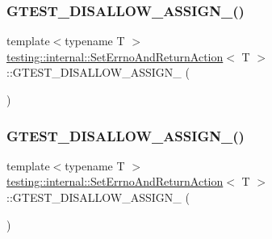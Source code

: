 \subsubsection{\texorpdfstring{GTEST\_DISALLOW\_ASSIGN\_()}{GTEST\_DISALLOW\_ASSIGN\_()}\hspace{0.1cm}{\footnotesize\ttfamily [1/3]}}
{\footnotesize\ttfamily template$<$typename T $>$ \\
\mbox{\hyperlink{classtesting_1_1internal_1_1_set_errno_and_return_action}{testing\+::internal\+::\+Set\+Errno\+And\+Return\+Action}}$<$ T $>$\+::G\+T\+E\+S\+T\+\_\+\+D\+I\+S\+A\+L\+L\+O\+W\+\_\+\+A\+S\+S\+I\+G\+N\+\_\+ (\begin{DoxyParamCaption}\item[{\mbox{\hyperlink{classtesting_1_1internal_1_1_set_errno_and_return_action}{Set\+Errno\+And\+Return\+Action}}$<$ T $>$}]{ }\end{DoxyParamCaption})\hspace{0.3cm}{\ttfamily [private]}}

\mbox{\label{classtesting_1_1internal_1_1_set_errno_and_return_action_a18906b36848b148a809907d105823ccc}} 
\subsubsection{\texorpdfstring{GTEST\_DISALLOW\_ASSIGN\_()}{GTEST\_DISALLOW\_ASSIGN\_()}\hspace{0.1cm}{\footnotesize\ttfamily [2/3]}}
{\footnotesize\ttfamily template$<$typename T $>$ \\
\mbox{\hyperlink{classtesting_1_1internal_1_1_set_errno_and_return_action}{testing\+::internal\+::\+Set\+Errno\+And\+Return\+Action}}$<$ T $>$\+::G\+T\+E\+S\+T\+\_\+\+D\+I\+S\+A\+L\+L\+O\+W\+\_\+\+A\+S\+S\+I\+G\+N\+\_\+ (\begin{DoxyParamCaption}\item[{\mbox{\hyperlink{classtesting_1_1internal_1_1_set_errno_and_return_action}{Set\+Errno\+And\+Return\+Action}}$<$ T $>$}]{ }\end{DoxyParamCaption})\hspace{0.3cm}{\ttfamily [private]}}

